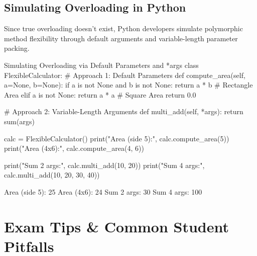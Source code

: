 \subsection{Simulating Overloading in Python}
Since true overloading doesn't exist, Python developers simulate polymorphic method flexibility through default arguments and variable-length parameter packing.

\begin{pythoncode}{Simulating Overloading via Default Parameters and *args}
class FlexibleCalculator:
    # Approach 1: Default Parameters
    def compute_area(self, a=None, b=None):
        if a is not None and b is not None:
            return a * b # Rectangle Area
        elif a is not None:
            return a * a # Square Area
        return 0.0

    # Approach 2: Variable-Length Arguments
    def multi_add(self, *args):
        return sum(args)

calc = FlexibleCalculator()
print("Area (side 5):", calc.compute_area(5))
print("Area (4x6):", calc.compute_area(4, 6))

print("Sum 2 args:", calc.multi_add(10, 20))
print("Sum 4 args:", calc.multi_add(10, 20, 30, 40))
\end{pythoncode}

\begin{outputbox}
Area (side 5): 25
Area (4x6): 24
Sum 2 args: 30
Sum 4 args: 100
\end{outputbox}

\section{Exam Tips \& Common Student Pitfalls}


